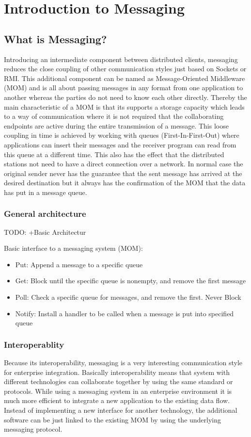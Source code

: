 \chapter{Introduction to Messaging} 
\section{What is Messaging?} 
Introducing an intermediate component between distributed
clients, messaging reduces the close coupling of other communication styles just
based on Sockets or RMI. This additional component can be named as
Message-Oriented Middleware (MOM) and is all about passing messages in any
format from one application to another whereas the parties do not need to know
each other directly. Thereby the main characteristic of a MOM is that its
supports a storage capacity which leads to a way of communication where it is
not required that the collaborating endpoints are active during the entire
transmission of a message. This loose coupling in time is achieved by
working with queues (First-In-First-Out) where applications can insert their
messages and the receiver program can read from this queue at a different time.
This also has the effect that the distributed stations not need to
have a direct connection over a network. In normal case the original sender
never has the guarantee that the sent message has arrived at the desired
destination but it always has the confirmation of the MOM that the data has put
in a message queue.  \cite{TAN06} \cite{PprIBMIntro}
 
\subsection{General architecture}
TODO: +Basic Architectur 

Basic interface to a messaging system (MOM): \cite{TAN06}
\begin{itemize}
	\item Put: Append a message to a specific queue 
	\item Get: Block until the specific queue is nonempty, and remove the
first message 
	\item Poll: Check a specific queue for messages, and remove the first.
Never Block 
	\item Notify: Install a handler to be called when a message is put into
specified queue
\end{itemize}

\subsection{Interoperablity}
Because its interoperability, messaging is a very interesting communication
style for enterprise integration. Basically interoperability means that system with
different technologies can collaborate together by using the same standard or
protocols. While using a messaging system in an enterprise environment it is
much more efficient to integrate a new application to the existing data flow.
Instead of implementing a new interface for another technology, the additional
software can be just linked to the existing MOM by using the underlying
messaging protocol.\\

